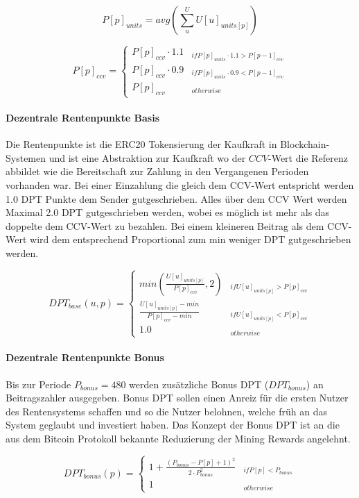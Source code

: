\begin{equation}
P[p]_{units} = avg(\sum_{u}^{U} U[u]_{units[p]})
\end{equation}

\begin{equation}
P[p]_{ccv} = \begin{cases} 
P[p]_{ccv} \cdot 1.1 & _{if P[p]_{units} \cdot 1.1 > P[p-1]_{ccv}} \\
P[p]_{ccv} \cdot 0.9 & _{if P[p]_{units} \cdot 0.9 < P[p-1]_{ccv}} \\
P[p]_{ccv} & _{otherwise}
\end{cases}
\end{equation}

\paragraph*{Dezentrale Rentenpunkte Basis}
Die Rentenpunkte ist die ERC20 Tokensierung der Kaufkraft in Blockchain-Systemen und ist eine Abstraktion zur Kaufkraft wo der $CCV$-Wert die Referenz abbildet wie die Bereitschaft zur Zahlung in den Vergangenen Perioden vorhanden war. Bei einer Einzahlung die gleich dem CCV-Wert entspricht werden 1.0 DPT Punkte dem Sender gutgeschrieben. Alles über dem CCV Wert werden Maximal 2.0 DPT gutgeschrieben werden, wobei es möglich ist mehr als das doppelte dem CCV-Wert zu bezahlen. Bei einem kleineren Beitrag als dem CCV-Wert wird dem entsprechend Proportional zum min weniger DPT gutgeschrieben werden.

\begin{equation}
DPT_{base}(u, p) = \begin{cases} 
min(\frac{U[u]_{units[p]}} {P[p]_{ccv}}, 2) 
  & _{if U[u]_{units[p]} > P[p]_{ccv}} \\
\frac{U[u]_{units[p]} - min} {P[p]_{ccv} - min} 
  & _{if U[u]_{units[p]} < P[p]_{ccv}} \\
1.0 & _{otherwise}
\end{cases}
\end{equation}

\paragraph*{Dezentrale Rentenpunkte Bonus}
Bis zur Periode $P_{bonus} = 480$ werden zusätzliche Bonus DPT 
($DPT_{bonus}$) an
Beitragszahler ausgegeben. Bonus DPT sollen einen Anreiz für
die ersten Nutzer des Rentensystems schaffen und so die Nutzer belohnen, 
welche früh an das System geglaubt und investiert haben. Das Konzept der Bonus DPT
ist an die aus dem Bitcoin Protokoll bekannte Reduzierung der Mining Rewards angelehnt.

\begin{equation}
DPT_{bonus}(p) = \begin{cases} 
1 + \frac{(P_{bonus} - P[p] + 1)^2}
      {2 \cdot P_{bonus}^2} & _{if P[p] < P_{bonus}} \\
1 & _{otherwise} 
\end{cases}
\end{equation}


